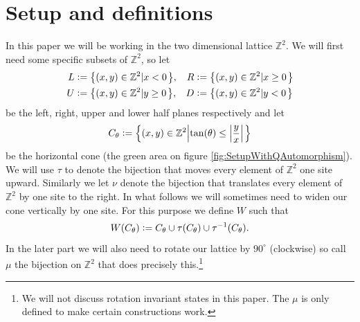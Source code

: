 \documentclass[12pt,a4paper,twoside]{article}
\newcommand{\defeq}{\vcentcolon=}
\let\originalleft\left
\let\originalright\right
\renewcommand{\left}{\mathopen{}\mathclose\bgroup\originalleft}
\renewcommand{\right}{\aftergroup\egroup\originalright}
\newcommand{\ZZ}{\mathbb Z}
\theoremstyle{definition}
\numberwithin{equation}{section}
\begin{document}
\section{Setup and definitions}\label{sec:Setup}
In this paper we will be working in the two dimensional lattice $\ZZ^2$. We will first need some specific subsets of $\ZZ^2$, so let
\begin{align}
	L&\defeq \left\{(x,y)\in\ZZ^2\left|x<0\right.\right\},&R&\defeq \left\{(x,y)\in\ZZ^2\left|x\geq 0\right.\right\}\\
	U&\defeq \left\{(x,y)\in\ZZ^2\left|y\geq 0\right.\right\},&D&\defeq \left\{(x,y)\in\ZZ^2\left|y<0\right.\right\}
\end{align}
be the left, right, upper and lower half planes respectively and let
\begin{equation}
	C_\theta\defeq \left\{(x,y)\in\ZZ^2\left|\tan(\theta)\leq\abs{\frac{y}{x}}\right.\right\}
\end{equation}
be the horizontal cone (the green area on figure \ref{fig:SetupWithQAutomorphism}). We will use $\tau$ to denote the bijection that moves every element of $\ZZ^2$ one site upward. Similarly we let $\nu$ denote the bijection that translates every element of $\ZZ^2$ by one site to the right. In what follows we will sometimes need to widen our cone vertically by one site. For this purpose we define $W$ such that
\begin{equation}
	W(C_\theta)\defeq C_\theta\cup\tau(C_\theta)\cup\tau^{-1}(C_\theta).
\end{equation}
In the later part we will also need to rotate our lattice by $90^\circ$ (clockwise) so call $\mu$ the bijection on $\ZZ^2$ that does precisely this.\footnote{We will not discuss rotation invariant states in this paper. The $\mu$ is only defined to make certain constructions work.}
\end{document}
